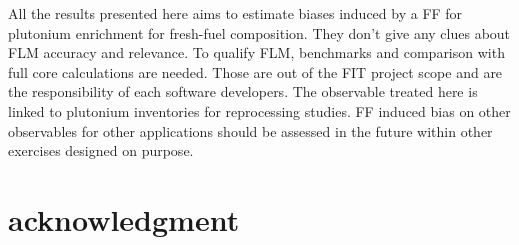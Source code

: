 All the results presented here aims to estimate biases induced by a \gls{FF} for
plutonium enrichment for fresh-fuel composition. They don't give any clues about
\gls{FLM} accuracy and relevance. To qualify \gls{FLM}, benchmarks and
comparison with full core calculations are needed. Those are out of the FIT
project scope and are the responsibility of each software developers. The
observable treated here is linked to plutonium inventories for reprocessing
studies. \gls{FF} induced bias on other observables for other applications
should be assessed in the future within other exercises designed on purpose.   

\section{acknowledgment}
